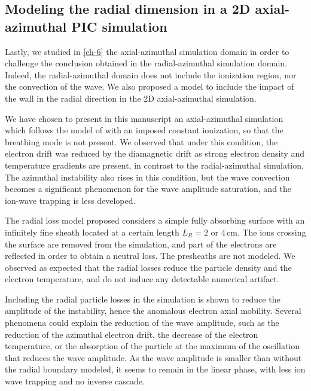   \subsection{Modeling the radial dimension in a 2D axial-azimuthal PIC simulation}

    Lastly, we studied in \cref{ch-6} the axial-azimuthal simulation domain in order to challenge the conclusion obtained in the radial-azimuthal simulation domain.
    Indeed, the radial-azimuthal domain does not include the ionization region, nor the convection of the wave.
    We also proposed a model to include the impact of the wall in the radial direction in the 2D axial-azimuthal simulation.

    We have chosen to present in this manuscript an axial-azimuthal simulation which follows the model of \citet{boeuf2018} with an imposed constant ionization, so that the breathing mode is not present.
    We observed that under this condition, the electron drift was reduced by the diamagnetic drift as strong electron density and temperature gradients are present, in contrast to the radial-azimuthal simulation.
    The azimuthal instability also rises in this condition, but the wave convection becomes a significant phenomenon for the wave amplitude saturation, and the ion-wave trapping is less developed.

    The radial loss model proposed considers a simple fully absorbing surface with an infinitely fine sheath located at a certain length $L_R=2$ or $4$\,cm.
    The ions crossing the surface are removed from the simulation, and part of the electrons are reflected in order to obtain a neutral loss.
    The presheaths are not modeled.
    We observed as expected that the radial losses reduce the particle density and the electron temperature, and do not induce any detectable numerical artifact.
    
    
    Including the radial particle losses in the simulation is shown to reduce the amplitude of the instability, hence the anomalous electron axial mobility.
    Several phenomena could explain the reduction of the wave amplitude, such as the reduction of the azimuthal electron drift, the decrease of the electron temperature, or the absorption of the particle at the maximum of the oscillation that reduces the wave amplitude.
    As the wave amplitude is smaller than without the radial boundary modeled, it seems to remain in the linear phase, with less ion wave trapping and no inverse cascade.


